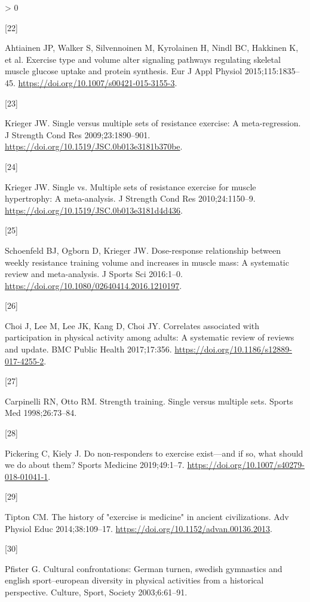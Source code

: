 \documentclass[twoside,10pt]{gihclass} %
\newlength{\cslhangindent}
\newlength{\csllabelwidth}
\newenvironment{CSLReferences}[3] %
 {%
  \setlength{\parindent}{0pt}
  \ifodd #1 \everypar{\setlength{\hangindent}{\cslhangindent}}\ignorespaces\fi
  \ifnum #2 > 0
  \setlength{\parskip}{#2\baselineskip}
  \fi
 }%
 {}
\newcommand{\CSLLeftMargin}[1]{\parbox[t]{\maxof{\widthof{#1}}{\csllabelwidth}}{#1}}
\newcommand{\CSLRightInline}[1]{\parbox[t]{\linewidth}{#1}}
\begin{document}
\begin{CSLReferences}{0}{0}
\leavevmode\hypertarget{ref-RN1837}{}%
\CSLLeftMargin{{[}22{]} }
\CSLRightInline{Ahtiainen JP, Walker S, Silvennoinen M, Kyrolainen H, Nindl BC, Hakkinen K, et al. Exercise type and volume alter signaling pathways regulating skeletal muscle glucose uptake and protein synthesis. Eur J Appl Physiol 2015;115:1835--45. \url{https://doi.org/10.1007/s00421-015-3155-3}.}

\leavevmode\hypertarget{ref-RN793}{}%
\CSLLeftMargin{{[}23{]} }
\CSLRightInline{Krieger JW. Single versus multiple sets of resistance exercise: A meta-regression. J Strength Cond Res 2009;23:1890--901. \url{https://doi.org/10.1519/JSC.0b013e3181b370be}.}

\leavevmode\hypertarget{ref-RN789}{}%
\CSLLeftMargin{{[}24{]} }
\CSLRightInline{Krieger JW. Single vs. Multiple sets of resistance exercise for muscle hypertrophy: A meta-analysis. J Strength Cond Res 2010;24:1150--9. \url{https://doi.org/10.1519/JSC.0b013e3181d4d436}.}

\leavevmode\hypertarget{ref-RN1767}{}%
\CSLLeftMargin{{[}25{]} }
\CSLRightInline{Schoenfeld BJ, Ogborn D, Krieger JW. Dose-response relationship between weekly resistance training volume and increases in muscle mass: A systematic review and meta-analysis. J Sports Sci 2016:1--0. \url{https://doi.org/10.1080/02640414.2016.1210197}.}

\leavevmode\hypertarget{ref-RN2063}{}%
\CSLLeftMargin{{[}26{]} }
\CSLRightInline{Choi J, Lee M, Lee JK, Kang D, Choi JY. Correlates associated with participation in physical activity among adults: A systematic review of reviews and update. BMC Public Health 2017;17:356. \url{https://doi.org/10.1186/s12889-017-4255-2}.}

\leavevmode\hypertarget{ref-RN794}{}%
\CSLLeftMargin{{[}27{]} }
\CSLRightInline{Carpinelli RN, Otto RM. Strength training. Single versus multiple sets. Sports Med 1998;26:73--84.}

\leavevmode\hypertarget{ref-RN2547}{}%
\CSLLeftMargin{{[}28{]} }
\CSLRightInline{Pickering C, Kiely J. Do non-responders to exercise exist---and if so, what should we do about them? Sports Medicine 2019;49:1--7. \url{https://doi.org/10.1007/s40279-018-01041-1}.}

\leavevmode\hypertarget{ref-RN2640}{}%
\CSLLeftMargin{{[}29{]} }
\CSLRightInline{Tipton CM. The history of "exercise is medicine" in ancient civilizations. Adv Physiol Educ 2014;38:109--17. \url{https://doi.org/10.1152/advan.00136.2013}.}

\leavevmode\hypertarget{ref-RN2663}{}%
\CSLLeftMargin{{[}30{]} }
\CSLRightInline{Pfister G. Cultural confrontations: German turnen, swedish gymnastics and english sport--european diversity in physical activities from a historical perspective. Culture, Sport, Society 2003;6:61--91.}


\end{CSLReferences}
\end{document}
